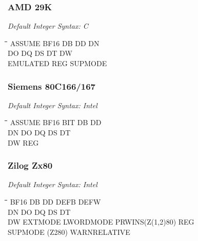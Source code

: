 \subsubsection{AMD 29K}

{\em Default Integer Syntax: C}

{\tt\begin{tabbing}
\hspace{3cm}\=\hspace{3cm}\=\hspace{3cm}\=\hspace{3cm}\=\kill
ASSUME     \> BF16        \> DB          \> DD          \> DN \\
DO         \> DQ          \> DS          \> DT          \> DW \\
EMULATED   \> REG         \> SUPMODE \\
\end{tabbing}}

\subsubsection{Siemens 80C166/167}

{\em Default Integer Syntax: Intel}

{\tt\begin{tabbing}
\hspace{3cm}\=\hspace{3cm}\=\hspace{3cm}\=\hspace{3cm}\=\kill
ASSUME     \> BF16        \> BIT         \> DB          \> DD \\
DN         \> DO          \> DQ          \> DS          \> DT \\
DW         \> REG \\
\end{tabbing}}

\subsubsection{Zilog Zx80}

{\em Default Integer Syntax: Intel}

{\tt\begin{tabbing}
\hspace{3cm}\=\hspace{3cm}\=\hspace{3cm}\=\hspace{3cm}\=\kill
BF16       \> DB          \> DD          \> DEFB        \> DEFW \\
DN         \> DO          \> DQ          \> DS          \> DT \\
DW         \> EXTMODE     \> LWORDMODE   \> PRWINS(Z(1,2)80)\> REG \\
SUPMODE (Z280) \> WARNRELATIVE \\
\end{tabbing}}

